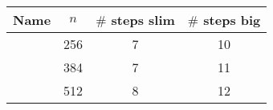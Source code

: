 \begin{table}
    \centering
    {
    \begin{tabular}{cccc}
      \toprule
      Name & $n$ & $\#$ steps slim & $\#$ steps big  \\
      \midrule
      \aCipherSmall{}  & 256 & 7 & 10 \\
      \aCipherMedium{} & 384 & 7 & 11 \\
      \aCipherLarge{}  & 512 & 8 & 12 \\
      \bottomrule
    \end{tabular}
    }
\end{table}